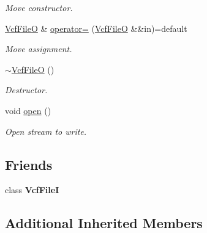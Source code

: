 \begin{DoxyCompactItemize}
\begin{DoxyCompactList}\small\item\em Move constructor. \end{DoxyCompactList}\item 
\mbox{\label{classsamp_files_1_1_vcf_file_o_a62287c4df04b76159d682c32e805c2b5}} 
\hyperlink{classsamp_files_1_1_vcf_file_o}{Vcf\+FileO} \& \hyperlink{classsamp_files_1_1_vcf_file_o_a62287c4df04b76159d682c32e805c2b5}{operator=} (\hyperlink{classsamp_files_1_1_vcf_file_o}{Vcf\+FileO} \&\&in)=default
\begin{DoxyCompactList}\small\item\em Move assignment. \end{DoxyCompactList}\item 
\mbox{\label{classsamp_files_1_1_vcf_file_o_af3f5d973c50baf88f99a62d60cac78cf}} 
\hyperlink{classsamp_files_1_1_vcf_file_o_af3f5d973c50baf88f99a62d60cac78cf}{$\sim$\+Vcf\+FileO} ()
\begin{DoxyCompactList}\small\item\em Destructor. \end{DoxyCompactList}\item 
\mbox{\label{classsamp_files_1_1_vcf_file_o_a6b88a49806da3af908bef1cd874fde4f}} 
void \hyperlink{classsamp_files_1_1_vcf_file_o_a6b88a49806da3af908bef1cd874fde4f}{open} ()
\begin{DoxyCompactList}\small\item\em Open stream to write. \end{DoxyCompactList}\end{DoxyCompactItemize}
\subsection*{Friends}
\begin{DoxyCompactItemize}
\item 
\mbox{\label{classsamp_files_1_1_vcf_file_o_a3118fbcd4def37c19a67e608fab09ba6}} 
class {\bfseries Vcf\+FileI}
\end{DoxyCompactItemize}
\subsection*{Additional Inherited Members}


